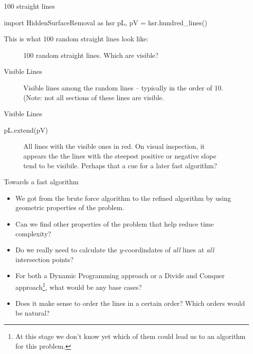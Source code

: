 \documentclass[ignorenonframetext,]{beamer}
\begin{document}
\begin{frame}[fragile]{100 straight lines}

  \begin{sympysilent}
    import HiddenSurfaceRemoval as hsr
    pL, pV = hsr.hundred_lines()
  \end{sympysilent}



  This is what 100 random straight lines look like:
  \begin{figure}
    \caption{100 random straight lines. Which are visible?}
    \centering
  \end{figure}
\end{frame}

\begin{frame}{Visible Lines}

  \begin{figure}
    \caption{Visible lines among the random lines -- typically in the
      order of 10. (Note: not all sections of these lines are visible.}
    \centering
  \end{figure}

\end{frame}

\begin{frame}[fragile]{Visible Lines}

  \begin{sympysilent}
    pL.extend(pV)
  \end{sympysilent}

  \begin{figure}
    \caption{All lines with the visible ones in red.   On visual inspection, it appears the the lines with the steepest
  positive or negative slope tend to be visibile. Perhaps that a cue
  for a later fast algorithm?}
    \centering
  \end{figure}
\end{frame}

\begin{frame}{Towards a fast algorithm}

\begin{itemize}[<+->]
    \item We got from the brute force algorithm to the refined
      algorithm by using geometric properties of the problem. 
    \item Can we find other properties of the problem that help reduce
      time complexity? 
    \item Do we really need to calculate the $y$-coordindates of
      \emph{all} lines at \emph{all} intersection points? 
    \item For both a Dynamic Programming approach or a Divide and
      Conquer approach\footnote{At this stage we don't know yet which
        of them could lead us to an algorithm for this problem.}, 
      what would be any base cases?
    \item Does it make sense to order the lines in a certain order?
      Which orders would be natural? 
\end{itemize}
\end{frame}
\end{document}
